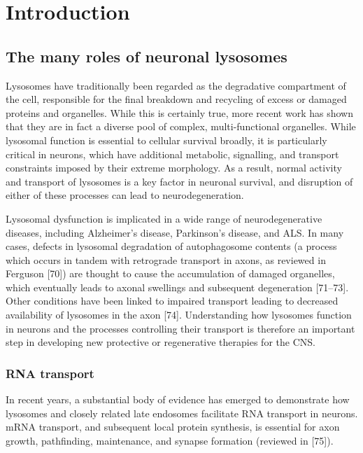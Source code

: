 \documentclass[
  12pt,
  a4paper,
]{book}
\begin{document}
\hypertarget{introduction}{%
\section{Introduction}\label{introduction}}

\hypertarget{the-many-roles-of-neuronal-lysosomes}{%
\subsection{The many roles of neuronal lysosomes}\label{the-many-roles-of-neuronal-lysosomes}}

Lysosomes have traditionally been regarded as the degradative compartment of the cell, responsible for the final breakdown and recycling of excess or damaged proteins and organelles. While this is certainly true, more recent work has shown that they are in fact a diverse pool of complex, multi-functional organelles. While lysosomal function is essential to cellular survival broadly, it is particularly critical in neurons, which have additional metabolic, signalling, and transport constraints imposed by their extreme morphology. As a result, normal activity and transport of lysosomes is a key factor in neuronal survival, and disruption of either of these processes can lead to neurodegeneration.

Lysosomal dysfunction is implicated in a wide range of neurodegenerative diseases, including Alzheimer's disease, Parkinson's disease, and ALS. In many cases, defects in lysosomal degradation of autophagosome contents (a process which occurs in tandem with retrograde transport in axons, as reviewed in Ferguson {[}70{]}) are thought to cause the accumulation of damaged organelles, which eventually leads to axonal swellings and subsequent degeneration {[}71--73{]}. Other conditions have been linked to impaired transport leading to decreased availability of lysosomes in the axon {[}74{]}. Understanding how lysosomes function in neurons and the processes controlling their transport is therefore an important step in developing new protective or regenerative therapies for the CNS.

\hypertarget{rna-transport}{%
\subsubsection{RNA transport}\label{rna-transport}}

In recent years, a substantial body of evidence has emerged to demonstrate how lysosomes and closely related late endosomes facilitate RNA transport in neurons. mRNA transport, and subsequent local protein synthesis, is essential for axon growth, pathfinding, maintenance, and synapse formation (reviewed in {[}75{]}).
\end{document}
